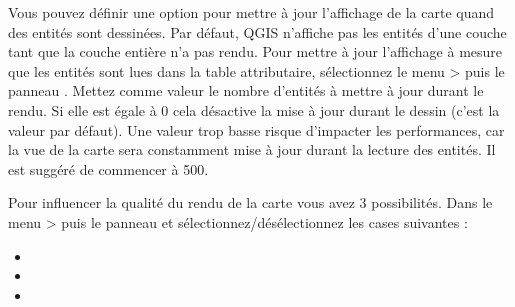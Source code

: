 \label{label_updatemap}

Vous pouvez définir une option pour mettre à jour l'affichage de la carte quand des entités sont dessinées. Par défaut, QGIS n'affiche pas les entités d'une couche tant que la couche entière n'a pas rendu. Pour mettre à jour l'affichage à mesure que les entités sont lues dans la table attributaire, sélectionnez le menu  >  puis le panneau . Mettez comme valeur le nombre d'entités à mettre à jour durant le rendu. Si elle est égale à 0 cela désactive la mise à jour durant le dessin (c'est la valeur par défaut). Une valeur trop basse risque d'impacter les performances, car la vue de la carte sera constamment mise à jour durant la lecture des entités. Il est suggéré de commencer à 500.

%
%

\label{label_renderquality}

Pour influencer la qualité du rendu de la carte vous avez 3 possibilités. Dans le menu  >  puis le panneau  et sélectionnez/désélectionnez les cases suivantes :

\begin{itemize}
\item {}
\item {}
\item {}
\end{itemize}

